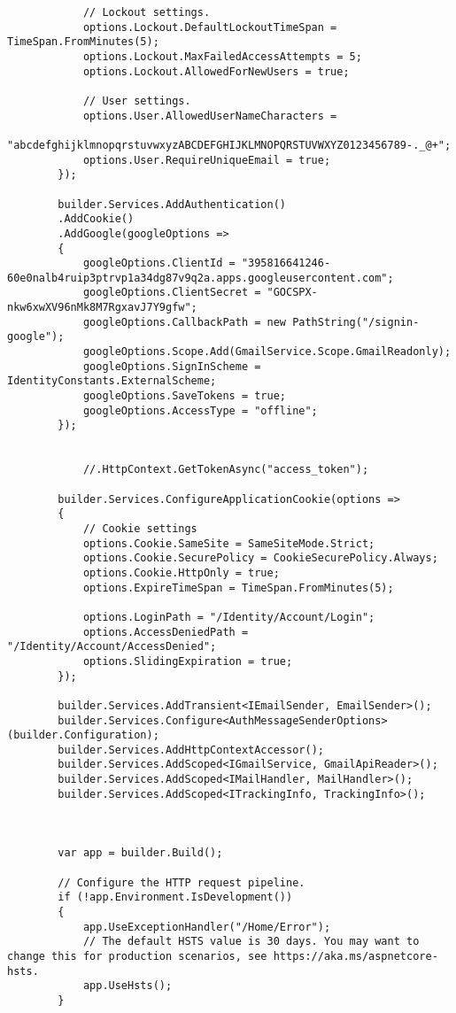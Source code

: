 \begin{verbatim}
            // Lockout settings.
            options.Lockout.DefaultLockoutTimeSpan = TimeSpan.FromMinutes(5);
            options.Lockout.MaxFailedAccessAttempts = 5;
            options.Lockout.AllowedForNewUsers = true;
        
            // User settings.
            options.User.AllowedUserNameCharacters =
            "abcdefghijklmnopqrstuvwxyzABCDEFGHIJKLMNOPQRSTUVWXYZ0123456789-._@+";
            options.User.RequireUniqueEmail = true;
        });
        
        builder.Services.AddAuthentication()
        .AddCookie()
        .AddGoogle(googleOptions =>
        {
            googleOptions.ClientId = "395816641246-60e0nalb4ruip3ptrvp1a34dg87v9q2a.apps.googleusercontent.com";
            googleOptions.ClientSecret = "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";
            googleOptions.CallbackPath = new PathString("/signin-google");
            googleOptions.Scope.Add(GmailService.Scope.GmailReadonly);
            googleOptions.SignInScheme = IdentityConstants.ExternalScheme;
            googleOptions.SaveTokens = true;
            googleOptions.AccessType = "offline";
        });
        
        
            //.HttpContext.GetTokenAsync("access_token");
        
        builder.Services.ConfigureApplicationCookie(options =>
        {
            // Cookie settings
            options.Cookie.SameSite = SameSiteMode.Strict;
            options.Cookie.SecurePolicy = CookieSecurePolicy.Always;
            options.Cookie.HttpOnly = true;
            options.ExpireTimeSpan = TimeSpan.FromMinutes(5);
        
            options.LoginPath = "/Identity/Account/Login";
            options.AccessDeniedPath = "/Identity/Account/AccessDenied";
            options.SlidingExpiration = true;
        });
        
        builder.Services.AddTransient<IEmailSender, EmailSender>();
        builder.Services.Configure<AuthMessageSenderOptions>(builder.Configuration);
        builder.Services.AddHttpContextAccessor();
        builder.Services.AddScoped<IGmailService, GmailApiReader>();
        builder.Services.AddScoped<IMailHandler, MailHandler>();
        builder.Services.AddScoped<ITrackingInfo, TrackingInfo>();
        
        
        
        var app = builder.Build();
        
        // Configure the HTTP request pipeline.
        if (!app.Environment.IsDevelopment())
        {
            app.UseExceptionHandler("/Home/Error");
            // The default HSTS value is 30 days. You may want to change this for production scenarios, see https://aka.ms/aspnetcore-hsts.
            app.UseHsts();
        }
        

\end{verbatim}
